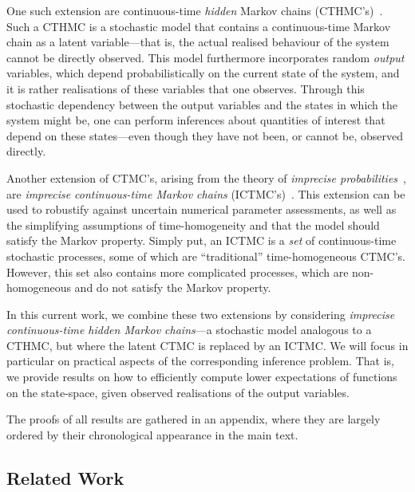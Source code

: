 \documentclass[twoside,11pt]{article}
\begin{document}
One such extension are continuous-time \emph{hidden} Markov chains (CTHMC's)~\citep{wei2002continuous}. Such a CTHMC is a stochastic model that contains a continuous-time Markov chain as a latent variable---that is, the actual realised behaviour of the system cannot be directly observed. This model furthermore incorporates random \emph{output} variables, which depend probabilistically on the current state of the system, and it is rather realisations of these variables that one observes. Through this stochastic dependency between the output variables and the states in which the system might be, one can perform inferences about quantities of interest that depend on these states---even though they have not been, or cannot be, observed directly.

Another extension of CTMC's, arising from the theory of \emph{imprecise probabilities}~\citep{Walley:1991vk}, are \emph{imprecise continuous-time Markov chains} (ICTMC's)~\citep{Skulj:2015cq, krak2016ictmc}. This extension can be used to robustify against uncertain numerical parameter assessments, as well as the simplifying assumptions of time-homogeneity and that the model should satisfy the Markov property. 
Simply put, an ICTMC is a \emph{set} of continuous-time stochastic processes, some of which are ``traditional'' time-homogeneous CTMC's. However, this set also contains more complicated processes, which are non-homogeneous and do not satisfy the Markov property.



In this current work, we combine these two extensions by considering \emph{imprecise continuous-time hidden Markov chains}---a stochastic model analogous to a CTHMC, but where the latent CTMC is replaced by an ICTMC. We will focus in particular on practical aspects of the corresponding inference problem. That is, we provide results on how to efficiently compute lower expectations of functions on the state-space, given observed realisations of the output variables. 

The proofs of all results are gathered in an appendix, where they are largely ordered by their chronological appearance in the main text.


\subsection{Related Work}\label{sec:related}
\end{document}
